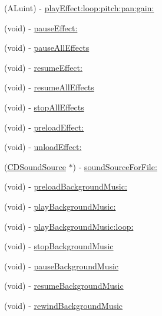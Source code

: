 \begin{DoxyCompactItemize}
\item 
(A\+Luint) -\/ \hyperlink{interfaceSimpleAudioEngine_ac3e279ef9259ed8c9cb15dc1341c62e6}{play\+Effect\+:loop\+:pitch\+:pan\+:gain\+:}
\item 
(void) -\/ \hyperlink{interfaceSimpleAudioEngine_aa40807db57397fc4dba272439fa017d7}{pause\+Effect\+:}
\item 
(void) -\/ \hyperlink{interfaceSimpleAudioEngine_a50ce3f003c8028e4e2c23e36db89d362}{pause\+All\+Effects}
\item 
(void) -\/ \hyperlink{interfaceSimpleAudioEngine_a3d8cc5eee577353bfd9daa51bbee376d}{resume\+Effect\+:}
\item 
(void) -\/ \hyperlink{interfaceSimpleAudioEngine_a502d7f9edde68126ebe1ecd9d29357e4}{resume\+All\+Effects}
\item 
(void) -\/ \hyperlink{interfaceSimpleAudioEngine_a41cac6b6201c29a06ce18e52191520de}{stop\+All\+Effects}
\item 
(void) -\/ \hyperlink{interfaceSimpleAudioEngine_a0f27d03cab04292f2dcbfc1ba8344e54}{preload\+Effect\+:}
\item 
(void) -\/ \hyperlink{interfaceSimpleAudioEngine_a1f3f121b3664c6b5bcfc33c8af63e52c}{unload\+Effect\+:}
\item 
(\hyperlink{interfaceCDSoundSource}{C\+D\+Sound\+Source} $\ast$) -\/ \hyperlink{interfaceSimpleAudioEngine_a8ab8450895ef35d23744db31e5826d01}{sound\+Source\+For\+File\+:}
\item 
(void) -\/ \hyperlink{interfaceSimpleAudioEngine_a289e2e89ab55d63a38792fd8f2e5b645}{preload\+Background\+Music\+:}
\item 
(void) -\/ \hyperlink{interfaceSimpleAudioEngine_ae48157a1dea7e96833cb705bd6cd6709}{play\+Background\+Music\+:}
\item 
(void) -\/ \hyperlink{interfaceSimpleAudioEngine_a57ba0d607696f7d86c66f03c321060ce}{play\+Background\+Music\+:loop\+:}
\item 
(void) -\/ \hyperlink{interfaceSimpleAudioEngine_a81e61f21116fc8d46b8242e9caa48006}{stop\+Background\+Music}
\item 
(void) -\/ \hyperlink{interfaceSimpleAudioEngine_addf0536bfbb9ad38668108ee289ccaf6}{pause\+Background\+Music}
\item 
(void) -\/ \hyperlink{interfaceSimpleAudioEngine_a565f2d3e28072b6a7173064b797767c0}{resume\+Background\+Music}
\item 
(void) -\/ \hyperlink{interfaceSimpleAudioEngine_ab91dfde414f3ef20ccd891e59ba5a67d}{rewind\+Background\+Music}
\item 

\end{DoxyCompactItemize}

